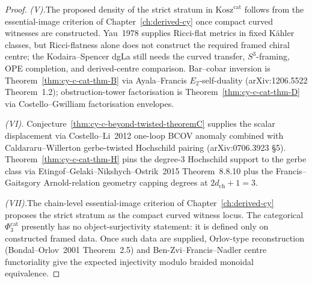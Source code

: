 \begin{proof}
\textit{(V).}\enspace The proposed density of the strict stratum in
$\mathrm{Kosz}^{\mathrm{cat}}$ follows from the essential-image
criterion of Chapter~\ref{ch:derived-cy} once compact curved witnesses
are constructed. Yau~1978 supplies Ricci-flat metrics in fixed K\"ahler
classes, but Ricci-flatness alone does not construct the required
framed chiral centre; the Kodaira--Spencer dgLa still needs the curved
transfer, $S^3$-framing, OPE completion, and derived-centre comparison.
Bar--cobar inversion is Theorem~\ref{thm:cy-c-cat-thm-B} via
Ayala--Francis $E_2$-self-duality (arXiv:1206.5522 Theorem~1.2);
obstruction-tower factorisation is Theorem~\ref{thm:cy-c-cat-thm-D}
via Costello--Gwilliam factorisation envelopes.

\textit{(VI).}\enspace
Conjecture~\ref{thm:cy-c-beyond-twisted-theoremC} supplies the scalar
displacement via Costello--Li~2012 one-loop BCOV anomaly combined with
Caldararu--Willerton gerbe-twisted Hochschild pairing (arXiv:0706.3923
\S 5). Theorem~\ref{thm:cy-c-cat-thm-H} pins the degree-$3$ Hochschild
support to the gerbe class via Etingof--Gelaki--Nikshych--Ostrik~2015
Theorem~8.8.10 plus the Francis--Gaitsgory Arnold-relation geometry
capping degrees at $2 d_{\mathrm{ch}} + 1 = 3$.

\textit{(VII).}\enspace The chain-level essential-image criterion of
Chapter~\ref{ch:derived-cy} proposes the strict stratum as the compact
curved witness locus. The categorical $\Phi_3^{\mathrm{cat}}$ presently
has no object-surjectivity statement: it is defined only on constructed
framed data. Once such data are supplied, Orlov-type reconstruction
(Bondal--Orlov~2001 Theorem~2.5) and Ben-Zvi--Francis--Nadler centre
functoriality give the expected injectivity modulo braided monoidal
equivalence.
\end{proof}

